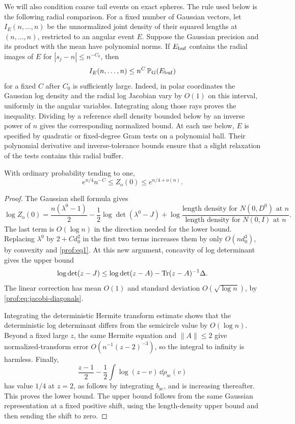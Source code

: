 We will also condition coarse tail events on exact spheres. The rule
used below is the following radial comparison. For a fixed number of
Gaussian vectors, let $I_E(n,\ldots,n)$ be the unnormalized joint
density of their squared lengths at $(n,\ldots,n)$, restricted to an
angular event $E$. Suppose the Gaussian precision and its product with
the mean have polynomial norms. If $E_{\rm buf}$ contains the radial
images of $E$ for $|s_j-n|\le n^{-C_0}$, then
\[
 I_E(n,\ldots,n)\le n^C\,\mathbb P_{\rm G}(E_{\rm buf})
\]
for a fixed $C$ after $C_0$ is sufficiently large. Indeed, in polar
coordinates the Gaussian log density and the radial log Jacobian vary
by $O(1)$ on this interval, uniformly in the angular variables.
Integrating along those rays proves the inequality. Dividing by a
reference shell density bounded below by an inverse power of $n$
gives the corresponding normalized bound. At each use below, $E$ is
specified by quadratic or fixed-degree Gram tests on a polynomial
ball. Their polynomial derivative and inverse-tolerance bounds ensure
that a slight relaxation of the tests contains this radial buffer.

\begin{lemma}\label{prof:lem:spherical-Z}
With ordinary probability tending to one,
\begin{equation}\label{prof:eq3}
 e^{n/4}n^{-C}\le Z_{\mathrm o}(0)\le e^{n/4+o(n)}.
\end{equation}
\end{lemma}

\begin{proof}
The Gaussian shell formula gives
\[
 \log Z_{\mathrm o}(0)
 =\frac{n(\lambda^0-1)}2
  -\frac12\log\det(\lambda^0-J)
  +\log\frac{\text{length density for }N(0,D^0)\text{ at }n}
                 {\text{length density for }N(0,I)\text{ at }n}.
\]
The last term is $O(\log n)$ in the direction needed for the lower
bound.  Replacing $\lambda^0$ by $2+Cd_0^2$ in the first two terms
increases them by only $O(nd_0^3)$, by convexity and
\eqref{prof:eq1}.  At this new argument, concavity of log determinant
gives the upper bound
\[
 \log\det(z-J)\le\log\det(z-A)-\operatorname{Tr}(z-A)^{-1}\Delta.
\]
The linear correction has mean $O(1)$ and standard deviation
$O(\sqrt{\log n})$, by \eqref{prof:eq:jacobi-diagonals}.

Integrating the deterministic Hermite transform estimate shows that
the deterministic log determinant differs from the semicircle value
by $O(\log n)$.  Beyond a fixed large $z$, the same Hermite equation
and $\|A\|\le2$ give normalized-transform error
$O(n^{-1}(z-2)^{-3})$, so the integral to infinity is harmless.
Finally,
\[
 \frac{z-1}{2}-\frac12\int\log(z-v)\,\dd\rho_{\mathrm{sc}}(v)
\]
has value $1/4$ at $z=2$, as follows by integrating
$b_{\mathrm{sc}}$, and is increasing thereafter.  This proves the
lower bound.  The upper bound follows from the same Gaussian
representation at a fixed positive shift, using the length-density
upper bound and then sending the shift to zero.
\end{proof}

